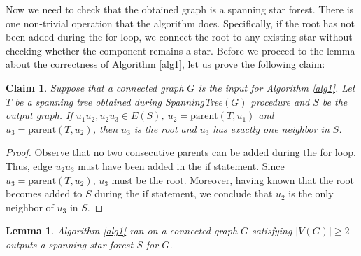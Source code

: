 \documentclass[en]{pracamgr}
\newtheorem{lemma}{Lemma}
\newtheorem{claim}{Claim}
\theoremstyle{definition}
\begin{document}
Now we need to check that the obtained graph is a spanning star forest. There is one non-trivial operation that the algorithm does. Specifically, if the root has not  been added during the for loop, we connect the root to any existing star without checking whether the component remains a star. Before we proceed to the lemma about the correctness of Algorithm \ref{alg1}, let us prove the following claim:
\begin{claim}\label{ssf root}
	Suppose that a connected graph $G$ is the input for Algorithm \ref{alg1}. Let $T$ be a spanning tree obtained during \textrm{SpanningTree}$(G)$ procedure and $S$ be the output graph. If $u_1 u_2,u_2 u_3 \in E(S)$, $u_2 = \textrm{parent}(T,u_1)$ and $u_3=\textrm{parent}(T,u_2)$, then $u_3$ is the root and $u_3$ has exactly one neighbor in $S$.
\end{claim}

\begin{proof}
	Observe that no two consecutive parents can be added during the for loop. Thus, edge $u_2 u_3$ must have been added in the if statement. Since $u_3 = \textrm{parent}(T,u_2)$, $u_3$ must be the root. Moreover, having known that the root becomes added to $S$ during the if statement, we conclude that $u_2$ is the only neighbor of $u_3$ in $S$. 
\end{proof}

\begin{lemma}\label{alg1 correctness}
	Algorithm \ref{alg1} ran on a connected graph $G$ satisfying $|V(G)| \geq 2$ outputs a spanning star forest $S$ for $G$.
\end{lemma}
\end{document}
